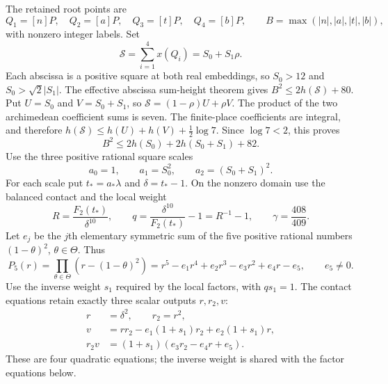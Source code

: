 \documentclass[11pt,a4paper]{article}
\begin{document}
The retained root points are
\[
 Q_1=[n]P,\quad Q_2=[a]P,\quad Q_3=[t]P,\quad Q_4=[b]P,
 \qquad B=\max(|n|,|a|,|t|,|b|),
\]
with nonzero integer labels. Set
\[
 \mathcal S=\sum_{i=1}^4x(Q_i)=S_0+S_1\rho.
\]
Each abscissa is a positive square at both real embeddings, so
$S_0>12$ and $S_0>\sqrt2|S_1|$. The effective abscissa sum-height
theorem \cite{Sums} gives $B^2\le2h(\mathcal S)+80$.
Put $U=S_0$ and $V=S_0+S_1$, so
$\mathcal S=(1-\rho)U+\rho V$. The product of the two archimedean
coefficient sums is seven. The finite-place coefficients are integral,
and therefore
$h(\mathcal S)\le h(U)+h(V)+\tfrac12\log7$.
Since $\log7<2$, this proves
\begin{equation}\label{eq:aggregate}
                  B^2\le2h(S_0)+2h(S_0+S_1)+82.
\end{equation}
Use the three positive rational square scales
\[
             a_0=1,\qquad a_1=S_0^2,\qquad a_2=(S_0+S_1)^2.
\]
For each scale put $t_*=a_*\lambda$ and $\delta=t_*-1$.
On the nonzero domain use the balanced contact and the local weight
\begin{equation}\label{eq:detector}
 R=\frac{F_2(t_*)}{\delta^{10}},\qquad
 q=\frac{\delta^{10}}{F_2(t_*)}-1=R^{-1}-1,
 \qquad \gamma=\frac{408}{409}.
\end{equation}
Let $e_j$ be the $j$th elementary symmetric sum of the five positive
rational numbers $(1-\theta)^2$, $\theta\in\Theta$. Thus
\[
 P_5(r)=\prod_{\theta\in\Theta}(r-(1-\theta)^2)
       =r^5-e_1r^4+e_2r^3-e_3r^2+e_4r-e_5,
 \qquad e_5\ne0.
\]
Use the inverse weight $s_1$ required by the local factors, with
$qs_1=1$. The contact equations retain exactly three scalar outputs
$r,r_2,v$:
\begin{equation}\label{eq:contactcircuit}
\begin{split}
 r&=\delta^2,\qquad r_2=r^2,\\
 v&=rr_2-e_1(1+s_1)r_2+e_2(1+s_1)r,\\
 r_2v&=(1+s_1)(e_3r_2-e_4r+e_5).
\end{split}
\end{equation}
These are four quadratic equations; the inverse weight is shared with
the factor equations below.
\end{document}
